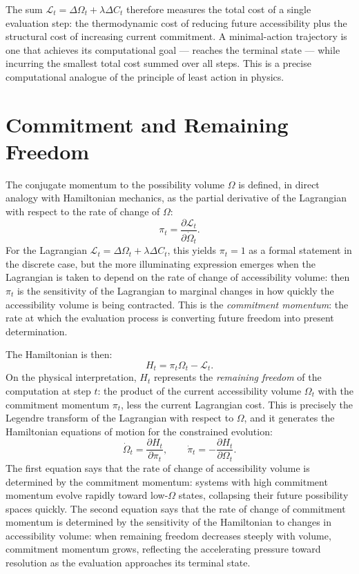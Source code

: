 \documentclass[12pt,openany]{book}
\theoremstyle{plain}
\theoremstyle{definition}
\theoremstyle{remark}
\begin{document}
The sum $\mathcal{L}_t = \Delta\Omega_t + \lambda \Delta C_t$ therefore measures the total cost of a single evaluation step: the thermodynamic cost of reducing future accessibility plus the structural cost of increasing current commitment. A minimal-action trajectory is one that achieves its computational goal — reaches the terminal state — while incurring the smallest total cost summed over all steps. This is a precise computational analogue of the principle of least action in physics.

\section{Commitment and Remaining Freedom}

The conjugate momentum to the possibility volume $\Omega$ is defined, in direct analogy with Hamiltonian mechanics, as the partial derivative of the Lagrangian with respect to the rate of change of $\Omega$:
\[
  \pi_t = \frac{\partial \mathcal{L}_t}{\partial \dot{\Omega}_t}.
\]
For the Lagrangian $\mathcal{L}_t = \Delta\Omega_t + \lambda \Delta C_t$, this yields $\pi_t = 1$ as a formal statement in the discrete case, but the more illuminating expression emerges when the Lagrangian is taken to depend on the rate of change of accessibility volume: then $\pi_t$ is the sensitivity of the Lagrangian to marginal changes in how quickly the accessibility volume is being contracted. This is the \emph{commitment momentum}: the rate at which the evaluation process is converting future freedom into present determination.

The Hamiltonian is then:
\[
  H_t = \pi_t \Omega_t - \mathcal{L}_t.
\]
On the physical interpretation, $H_t$ represents the \emph{remaining freedom} of the computation at step $t$: the product of the current accessibility volume $\Omega_t$ with the commitment momentum $\pi_t$, less the current Lagrangian cost. This is precisely the Legendre transform of the Lagrangian with respect to $\Omega$, and it generates the Hamiltonian equations of motion for the constrained evolution:
\[
  \dot{\Omega}_t = \frac{\partial H_t}{\partial \pi_t}, \qquad
  \dot{\pi}_t = -\frac{\partial H_t}{\partial \Omega_t}.
\]
The first equation says that the rate of change of accessibility volume is determined by the commitment momentum: systems with high commitment momentum evolve rapidly toward low-$\Omega$ states, collapsing their future possibility spaces quickly. The second equation says that the rate of change of commitment momentum is determined by the sensitivity of the Hamiltonian to changes in accessibility volume: when remaining freedom decreases steeply with volume, commitment momentum grows, reflecting the accelerating pressure toward resolution as the evaluation approaches its terminal state.
\end{document}
